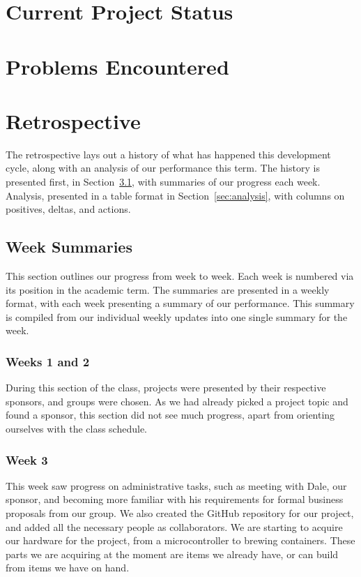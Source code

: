 \documentclass[draftclsnofoot,onecolumn,letterpaper,10pt]{IEEEtran}
\begin{document}
\section{Current Project Status}%

\section{Problems Encountered}%

\section{Retrospective}
The retrospective lays out a history of what has happened this development cycle, along with an analysis of our performance this term.
The history is presented first, in Section~\ref{sec:weekSummaries}, with summaries of our progress each week.
Analysis, presented in a table format in Section~\ref{sec:analysis}, with columns on positives, deltas, and actions.

\subsection{Week Summaries}\label{sec:weekSummaries}
This section outlines our progress from week to week.
Each week is numbered via its position in the academic term.
The summaries are presented in a weekly format, with each week presenting a summary of our performance.
This summary is compiled from our individual weekly updates into one single summary for the week. %

\subsubsection{Weeks 1 and 2}
During this section of the class, projects were presented by their respective sponsors, and groups were chosen.
As we had already picked a project topic and found a sponsor, this section did not see much progress, apart from orienting ourselves with the class schedule.

\subsubsection{Week 3} %
This week saw progress on administrative tasks, such as meeting with Dale, our sponsor, and becoming more familiar with his requirements for formal business proposals from our group.
We also created the GitHub repository for our project, and added all the necessary people as collaborators.
We are starting to acquire our hardware for the project, from a microcontroller to brewing containers. 
These parts we are acquiring at the moment are items we already have, or can build from items we have on hand.
\end{document}
